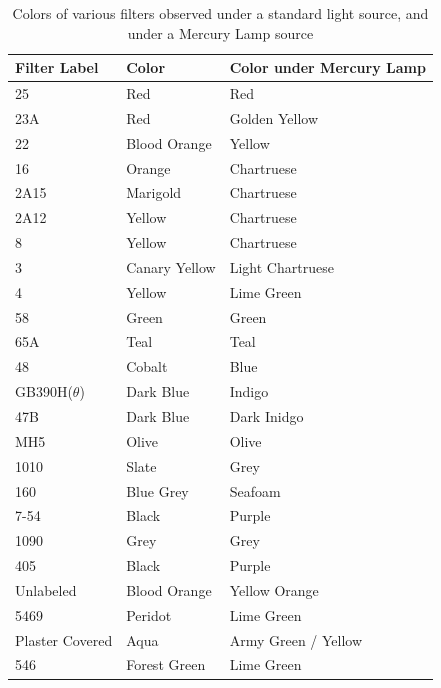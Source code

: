 \documentclass[a4paper]{article}
\begin{document}
\begin{table}[H]
  \caption{Colors of various filters observed under a standard light source, and under a Mercury Lamp source}
  \begin{center}
    \begin{tabular}{|l|l|l|}
      \hline
		Filter Label	&	Color 	&	Color under Mercury Lamp	\\
\hline					
25	&	Red	&	Red	\\
23A	&	Red	&	Golden Yellow	\\
22	&	Blood Orange	&	Yellow 	\\
16	&	Orange	&	Chartruese	\\
2A15	&	Marigold	&	Chartruese	\\
2A12	&	Yellow	&	Chartruese	\\
8	&	Yellow	&	Chartruese	\\
3	&	Canary Yellow	&	Light Chartruese	\\
4	&	Yellow	&	Lime Green	\\
58	&	Green	&	Green	\\
65A	&	Teal	&	Teal	\\
48	&	Cobalt	&	Blue	\\
GB390H($\theta$)	&	Dark Blue	&	Indigo	\\
47B	&	Dark Blue	&	Dark Inidgo	\\
MH5	&	Olive	&	Olive	\\
1010	&	Slate	&	Grey	\\
160	&	Blue Grey	&	Seafoam	\\
7-54	&	Black	&	Purple	\\
1090	&	Grey	&	Grey	\\
405	&	Black	&	Purple	\\
Unlabeled	&	Blood Orange	&	Yellow Orange 	\\
5469	&	Peridot	&	Lime Green	\\
Plaster Covered	&	Aqua	&	Army Green / Yellow	\\
546	&	Forest Green	&	Lime Green	\\
      \hline
    \end{tabular}
  \end{center}
  \label{tab:observed_colors}
\end{table}

\end{document}
